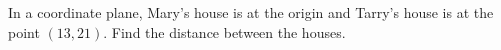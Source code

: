 In a coordinate plane, Mary's house is at the origin and Tarry's house is at the point $(13,21)$. Find the distance between the houses.
